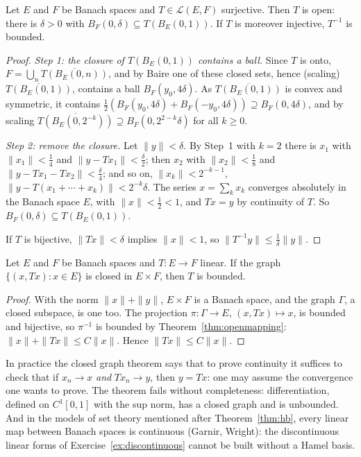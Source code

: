 \begin{theorem}\label{thm:openmapping}
Let $E$ and $F$ be Banach spaces and $T\in\mathcal L(E,F)$ surjective. Then $T$ is open: there is $\delta>0$ with $B_F(0,\delta)\subseteq T(B_E(0,1))$. If $T$ is moreover injective, $T^{-1}$ is bounded.
\end{theorem}
\begin{proof}
\emph{Step 1: the closure of $T(B_E(0,1))$ contains a ball.} Since $T$ is onto, $F=\bigcup_n\overline{T(B_E(0,n))}$, and by Baire one of these closed sets, hence (scaling) $\overline{T(B_E(0,1))}$, contains a ball
$B_F(y_0,4\delta)$. As $\overline{T(B_E(0,1))}$ is convex and symmetric, it contains $\frac12(B_F(y_0,4\delta)+B_F(-y_0,4\delta))\supseteq B_F(0,4\delta)$, and by scaling $\overline{T(B_E(0,2^{-k}))}\supseteq B_F(0,2^{2-k}\delta)$ for all $k\ge0$.

\emph{Step 2: remove the closure.} Let $\|y\|<\delta$. By Step~1 with $k=2$ there is $x_1$ with $\|x_1\|<\frac14$ and $\|y-Tx_1\|<\frac\delta2$; then $x_2$ with $\|x_2\|<\frac18$ and $\|y-Tx_1-Tx_2\|<\frac\delta4$; and so on,
$\|x_k\|<2^{-k-1}$, $\|y-T(x_1+\cdots+x_k)\|<2^{-k}\delta$. The series $x=\sum_kx_k$ converges absolutely in the Banach space $E$, with $\|x\|<\frac12<1$, and $Tx=y$ by continuity of $T$. So $B_F(0,\delta)\subseteq T(B_E(0,1))$.

If $T$ is bijective, $\|Tx\|<\delta$ implies $\|x\|<1$, so $\|T^{-1}y\|\le\frac1\delta\|y\|$.
\end{proof}

\begin{theorem}\label{thm:closedgraph}
Let $E$ and $F$ be Banach spaces and $T:E\to F$ linear. If the graph $\{(x,Tx):x\in E\}$ is closed in $E\times F$, then $T$ is bounded.
\end{theorem}
\begin{proof}
With the norm $\|x\|+\|y\|$, $E\times F$ is a Banach space, and the graph $\Gamma$, a closed subspace, is one too. The projection $\pi:\Gamma\to E$, $(x,Tx)\mapsto x$, is bounded and bijective, so $\pi^{-1}$ is bounded by
Theorem~\ref{thm:openmapping}: $\|x\|+\|Tx\|\le C\|x\|$. Hence $\|Tx\|\le C\|x\|$.
\end{proof}

In practice the closed graph theorem says that to prove continuity it suffices to check that if $x_n\to x$ \emph{and} $Tx_n\to y$, then $y=Tx$: one may assume the convergence one wants to prove. The theorem fails without
completeness: differentiation, defined on $C^1[0,1]$ with the sup norm, has a closed graph and is unbounded. And in the models of set theory mentioned after Theorem~\ref{thm:hb}, every linear map between Banach spaces is
continuous (Garnir, Wright): the discontinuous linear forms of Exercise~\ref{ex:discontinuous} cannot be built without a Hamel basis.

